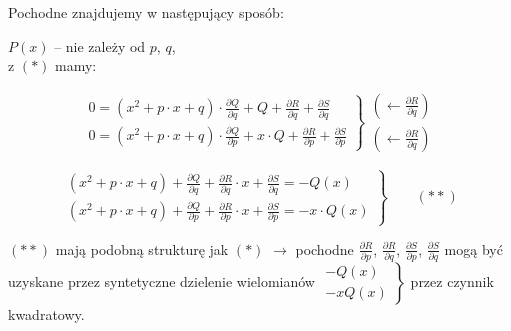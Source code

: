 \begin{frame}
  Pochodne znajdujemy w następujący sposób:

  $P(x)$ -- nie zależy od $p$, $q$, \\ z $(*)$ mamy:

  $$\left. \begin{array}{l}
  0 = (x^2 + p \cdot x + q) \cdot \frac{{\partial}Q}{{\partial}q} + Q + \frac{{\partial}R}{{\partial}q} + \frac{{\partial}S}{{\partial}q} \\ %
  0 = (x^2 + p \cdot x + q) \cdot \frac{{\partial}Q}{{\partial}p} + x \cdot Q + \frac{{\partial}R}{{\partial}p} + \frac{{\partial}S}{{\partial}p} %
  \end{array}\right\}
  \begin{array}{l}
    \left( \leftarrow \frac{{\partial}R}{{\partial}q} \right) \\
    \left( \leftarrow \frac{{\partial}R}{{\partial}q} \right) %
  \end{array}$$

  $$\left. \begin{array}{l}
  (x^2 + p \cdot x + q) + \frac{{\partial}Q}{{\partial}q} + \frac{{\partial}R}{{\partial}q} \cdot x + \frac{{\partial}S}{{\partial}q} = -Q(x) \\ %
  (x^2 + p \cdot x + q) + \frac{{\partial}Q}{{\partial}p} + \frac{{\partial}R}{{\partial}p} \cdot x + \frac{{\partial}S}{{\partial}p} = -x \cdot Q(x) %
  \end{array}\right\}
  \qquad (**)$$
\end{frame}

\begin{frame}
  $(**)$ mają podobną strukturę jak $(*)$ $\rightarrow$ pochodne $\frac{{\partial}R}{{\partial}p}$, $\frac{{\partial}R}{{\partial}q}$, $\frac{{\partial}S}{{\partial}p}$, $\frac{{\partial}S}{{\partial}q}$ mogą być uzyskane przez syntetyczne dzielenie wielomianów $\left.\begin{array}{l} -Q(x) \\ -x Q(x) \end{array} \right\}$ przez czynnik kwadratowy.
\end{frame}
